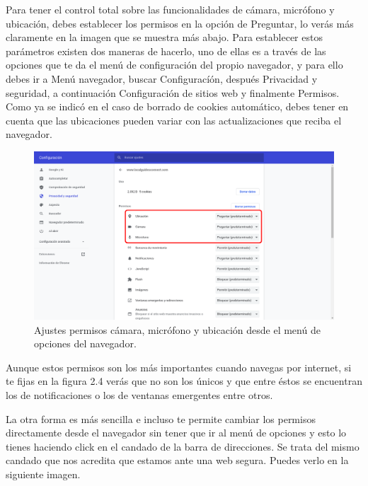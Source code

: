 \documentclass[
  spanish,
  a4paper,
  openany]{book}
\begin{document}
Para tener el control total sobre las funcionalidades de cámara, micrófono y ubicación, debes establecer los permisos en la opción de Preguntar, lo verás más claramente en la imagen que se muestra más abajo. Para establecer estos parámetros existen dos maneras de hacerlo, uno de ellas es a través de las opciones que te da el menú de configuración del propio navegador, y para ello debes ir a Menú navegador, buscar Configuracíón, después Privacidad y seguridad, a continuación Configuración de sitios web y finalmente Permisos. Como ya se indicó en el caso de borrado de cookies automático, debes tener en cuenta que las ubicaciones pueden variar con las actualizaciones que reciba el navegador.

\begin{figure}

{\centering \includegraphics[width=0.75\linewidth]{images/ajuste-permisos} 

}

\caption{Ajustes permisos cámara, micrófono y ubicación desde el menú de opciones del navegador.}\label{fig:unnamed-chunk-7}
\end{figure}

Aunque estos permisos son los más importantes cuando navegas por internet, si te fijas en la figura 2.4 verás que no son los únicos y que entre éstos se encuentran los de notificaciones o los de ventanas emergentes entre otros.

La otra forma es más sencilla e incluso te permite cambiar los permisos directamente desde el navegador sin tener que ir al menú de opciones y esto lo tienes haciendo click en el candado de la barra de direcciones. Se trata del mismo candado que nos acredita que estamos ante una web segura. Puedes verlo en la siguiente imagen.
\end{document}
